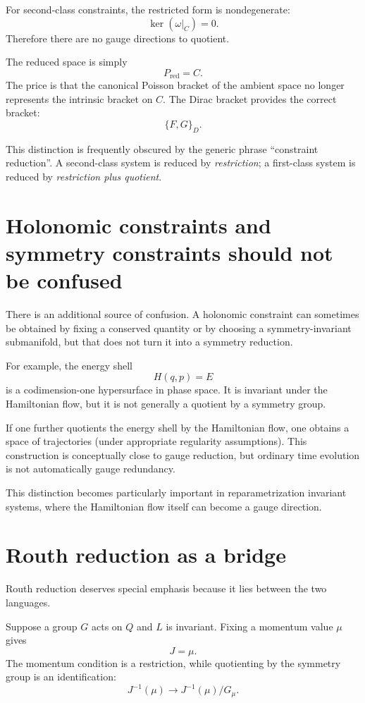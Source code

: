 For second-class constraints, the restricted form is nondegenerate:
\[
        \ker(\omega|_C)=0.
\]
Therefore there are no gauge directions to quotient.

The reduced space is simply
\[
        P_{\mathrm{red}}=C.
\]
The price is that the canonical Poisson bracket of the ambient space no
longer represents the intrinsic bracket on $C$.  The Dirac bracket provides
the correct bracket:
\[
        \{F,G\}_D.
\]

This distinction is frequently obscured by the generic phrase ``constraint
reduction''.  A second-class system is reduced by \emph{restriction}; a
first-class system is reduced by \emph{restriction plus quotient}.

\section{Holonomic constraints and symmetry constraints should not be confused}

There is an additional source of confusion.  A holonomic constraint can
sometimes be obtained by fixing a conserved quantity or by choosing a
symmetry-invariant submanifold, but that does not turn it into a symmetry
reduction.

For example, the energy shell
\[
        H(q,p)=E
\]
is a codimension-one hypersurface in phase space.  It is invariant under the
Hamiltonian flow, but it is not generally a quotient by a symmetry group.

If one further quotients the energy shell by the Hamiltonian flow, one obtains
a space of trajectories (under appropriate regularity assumptions).  This
construction is conceptually close to gauge reduction, but ordinary time
evolution is not automatically gauge redundancy.

This distinction becomes particularly important in reparametrization
invariant systems, where the Hamiltonian flow itself can become a gauge
direction.

\section{Routh reduction as a bridge}

Routh reduction deserves special emphasis because it lies between the two
languages.

Suppose a group $G$ acts on $Q$ and $L$ is invariant.  Fixing a momentum
value $\mu$ gives
\[
        J=\mu.
\]
The momentum condition is a restriction, while quotienting by the symmetry
group is an identification:
\[
        J^{-1}(\mu)
        \longrightarrow
        J^{-1}(\mu)/G_\mu.
\]

